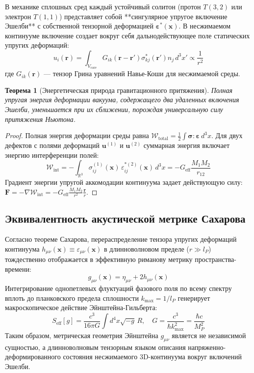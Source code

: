 \documentclass[12pt,a4paper]{article}
\newtheorem{theorem}{Теорема}
\begin{document}
	В механике сплошных сред каждый устойчивый солитон (протон $T(3,2)$ или электрон $T(1,1)$) представляет собой **сингулярное упругое включение Эшелби** с собственной тензорной деформацией $\boldsymbol{\varepsilon}^*(\mathbf{x})$. В несжимаемом континууме включение создает вокруг себя дальнодействующее поле статических упругих деформаций:
	\begin{equation}
		u_i(\mathbf{r}) = \int_{V_{\text{core}}} G_{ik}(\mathbf{r} - \mathbf{r}') \sigma_{kj}^*(\mathbf{r}') n_j \, d^3x' \propto \frac{1}{r^2}
	\end{equation}
	где $G_{ik}(\mathbf{r})$ — тензор Грина уравнений Навье-Коши для несжимаемой среды.
	
	\begin{theorem}[Энергетическая природа гравитационного притяжения]
		Полная упругая энергия деформации вакуума, содержащего два удаленных включения Эшелби, уменьшается при их сближении, порождая универсальную силу притяжения Ньютона.
	\end{theorem}
	
	\begin{proof}
		Полная энергия деформации среды равна $\mathcal{W}_{\text{total}} = \frac{1}{2} \int \boldsymbol{\sigma} : \boldsymbol{\varepsilon} \, d^3x$. Для двух дефектов с полями деформаций $\mathbf{u}^{(1)}$ и $\mathbf{u}^{(2)}$ суммарная энергия включает энергию интерференции полей:
		\begin{equation}
			\mathcal{W}_{\text{int}} = -\int_{\mathbb{R}^3} \sigma_{ij}^{(1)}(\mathbf{x}) \, \varepsilon_{ij}^{*(2)}(\mathbf{x}) \, d^3x = - G_{\text{eff}} \frac{M_1 M_2}{r_{12}}
		\end{equation}
		Градиент энергии упругой аккомодации континуума задает действующую силу: $\mathbf{F} = -\nabla \mathcal{W}_{\text{int}} = - G_{\text{eff}} \frac{M_1 M_2}{r^2} \frac{\mathbf{r}}{r}$.
	\end{proof}
	
	\subsection{Эквивалентность акустической метрике Сахарова}
	Согласно теореме Сахарова, перераспределение тензора упругих деформаций континуума $h_{\mu\nu}(\mathbf{x}) \equiv \varepsilon_{\mu\nu}(\mathbf{x})$ в длинноволновом пределе ($r \gg l_P$) тождественно отображается в эффективную риманову метрику пространства-времени:
	\begin{equation}
		g_{\mu\nu}(\mathbf{x}) = \eta_{\mu\nu} + 2 h_{\mu\nu}(\mathbf{x})
	\end{equation}
	Интегрирование однопетлевых флуктуаций фазового поля по всему спектру вплоть до планковского предела сплошности $k_{\text{max}} = 1/l_P$ генерирует макроскопическое действие Эйнштейна-Гильберта:
	\begin{equation}
		S_{\text{eff}}[g] = \frac{c^3}{16\pi G} \int d^4x \sqrt{-g} \, R, \quad G = \frac{c^3}{\hbar k_{\text{max}}^2} = \frac{\hbar c}{M_P^2}
	\end{equation}
	Таким образом, метрическая геометрия Эйнштейна $g_{\mu\nu}$ является не независимой сущностью, а длинноволновым тензорным языком описания напряженно-деформированного состояния несжимаемого 3D-континуума вокруг включений Эшелби.
	
\end{document}
